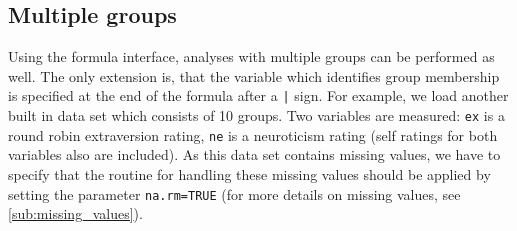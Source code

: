 \documentclass[a4paper]{article}\usepackage[]{graphicx}\usepackage[]{color}
\begin{document}
\subsection{Multiple groups} %
\label{sub:multiple_groups}
Using the formula interface, analyses with multiple groups can be performed as well. The only extension is, that the variable which identifies group membership is specified at the end of the formula after a \texttt{|} sign. For example, we load another built in data set which consists of 10 groups. Two variables are measured: \texttt{ex} is a round robin extraversion rating, \texttt{ne} is a neuroticism rating (self ratings for both variables also are included). As this data set contains missing values, we have to specify that the routine for handling these missing values should be applied by setting the parameter \texttt{na.rm=TRUE} (for more details on missing values, see \ref{sub:missing_values}).
\end{document}
